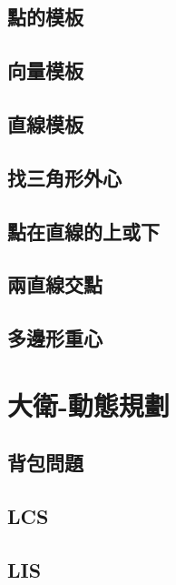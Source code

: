 \subsection{點的模板}
\raggedbottom
\hrulefill
\subsection{向量模板}
\raggedbottom
\hrulefill
\subsection{直線模板}
\raggedbottom
\hrulefill
\subsection{找三角形外心}
\raggedbottom
\hrulefill
\subsection{點在直線的上或下}
\raggedbottom
\hrulefill
\subsection{兩直線交點}
\raggedbottom
\hrulefill
\subsection{多邊形重心}
\raggedbottom
\hrulefill

\section{大衛-動態規劃}
\subsection{背包問題}
\raggedbottom
\hrulefill
\subsection{LCS}
\raggedbottom
\hrulefill
\subsection{LIS}
\raggedbottom
\hrulefill
